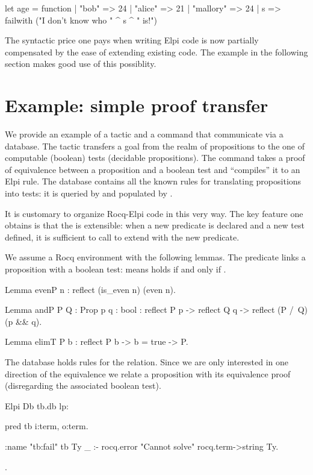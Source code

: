 \documentclass[a4paper, 11pt]{book}
\begin{document}
\begin{ocamlcode}
let age = function
  | "bob" => 24
  | "alice" => 21
  | "mallory" => 24
  | s => failwith ("I don't know who " ^ s ^ " is!")
\end{ocamlcode}
  
The syntactic price one pays when writing Elpi code is now partially
compensated by the ease of extending existing code.
The example in the following section makes good use of this possiblity.

\section{Example: simple proof transfer}\label{sec:tb}

We provide an example of a tactic and a command that communicate via
a database. The tactic  transfers a goal from the realm
of propositions to the one of computable (boolean) tests (decidable propositions).
The command  takes a proof of equivalence
between a proposition and a boolean test and ``compiles'' it to an Elpi rule.
The database contains all the known rules for translating propositions into
tests: it is queried by  and populated by .

It is customary to organize Rocq-Elpi code in this very way. The key feature
one obtains is that the  is extensible: when a new
predicate is declared and a new test defined, it is sufficient to call
 to extend  with the new
predicate.

We assume a Rocq environment with the following lemmas. The 
predicate links a proposition with a boolean test: 
means  holds if and only if .

\begin{rocqcode}
Lemma evenP n : reflect (is_even n) (even n).

Lemma andP  {P Q : Prop} {p q : bool} :
  reflect P p -> reflect Q q -> reflect (P /\ Q) (p && q).

Lemma elimT {P b} :
  reflect P b -> b = true -> P.
\end{rocqcode}

The database holds rules for the  relation. Since
we are only interested in one direction of the equivalence we
relate a proposition with its equivalence proof (disregarding the
associated boolean test).

\begin{rocqcode}
Elpi Db tb.db lp:{{

pred tb i:term, o:term.

:name "tb:fail"
tb Ty _ :- rocq.error "Cannot solve" {rocq.term->string Ty}.

}}.
\end{rocqcode}
\end{document}

